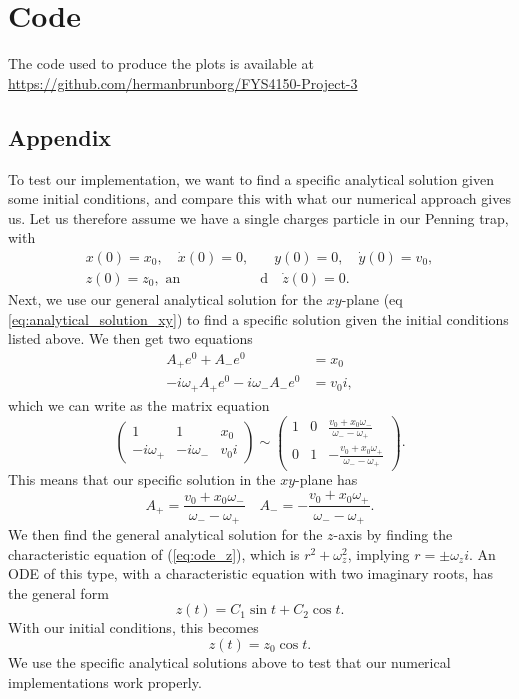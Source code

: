 \section*{Code}

The code used to produce the plots is available at \url{https://github.com/hermanbrunborg/FYS4150-Project-3}

\subsection*{Appendix }
\label{analytical}

To test our implementation, we want to find a specific analytical solution given some initial conditions, and compare this with what our numerical approach gives us. Let us therefore assume we have a single charges particle in our Penning trap, with
%
\begin{align*}
x(0) = x_0, \quad \dot x(0) = 0, &\quad y(0) = 0, \quad \dot y(0) = v_0, \\
z(0) = z_0, \text{ an}&\text{d} \quad \dot z(0) = 0.
\end{align*}
%
Next, we use our general analytical solution for the $xy$-plane (eq \ref{eq:analytical_solution_xy}) to find a specific solution given the initial conditions listed above. We then get two equations
%
\begin{align}
A_+ e^0 + A_- e^0 &= x_0 \\
-i \omega_+ A_+ e^0 -i \omega_- A_- e^0 &= v_0 i,
\end{align}
%
which we can write as the matrix equation
\begin{equation*}
\begin{pmatrix}
1 & 1 & x_0 \\
-i\omega_+ & -i \omega_- & v_0 i
\end{pmatrix}
\sim
\begin{pmatrix}
1 & 0 & \frac{v_0 + x_0 \omega_-}{\omega_- - \omega_+} \\
0 & 1 & -\frac{v_0 + x_0 \omega_+}{\omega_- - \omega_+}
\end{pmatrix}.
\end{equation*}
%
This means that our specific solution in the $xy$-plane has
%
\begin{equation*}
A_+ = \frac{v_0 + x_0 \omega_-}{\omega_- - \omega_+} \quad 
A_- = -\frac{v_0 + x_0 \omega_+}{\omega_- - \omega_+}.
\end{equation*}
%
We then find the general analytical solution for the $z$-axis by finding the characteristic equation of (\ref{eq:ode_z}), which is $r^2 + \omega_z^2$, implying $r = \pm \omega_z i$. An ODE of this type, with a characteristic equation with two imaginary roots, has the general form
%
\begin{equation*}
    z(t) = C_1 \sin t + C_2 \cos t.
\end{equation*}
%
With our initial conditions, this becomes
%
\begin{equation*}
    z(t) = z_0 \cos t.
\end{equation*}
%
We use the specific analytical solutions above to test that our numerical implementations work properly.



